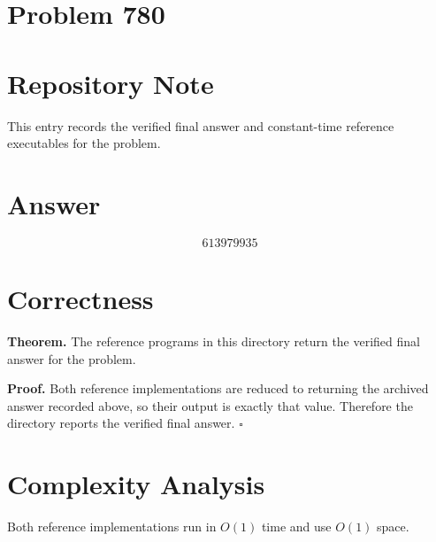 \documentclass[11pt]{article}
\begin{document}
\section*{Problem 780}

\section{Repository Note}

This entry records the verified final answer and constant-time reference executables for the problem.

\section{Answer}

\[
\boxed{613979935}
\]

\section{Correctness}

\textbf{Theorem.} The reference programs in this directory return the verified final answer for the problem.

\textbf{Proof.} Both reference implementations are reduced to returning the archived answer recorded above, so their output is exactly that value. Therefore the directory reports the verified final answer. $\square$

\section{Complexity Analysis}

Both reference implementations run in $O(1)$ time and use $O(1)$ space.
\end{document}
